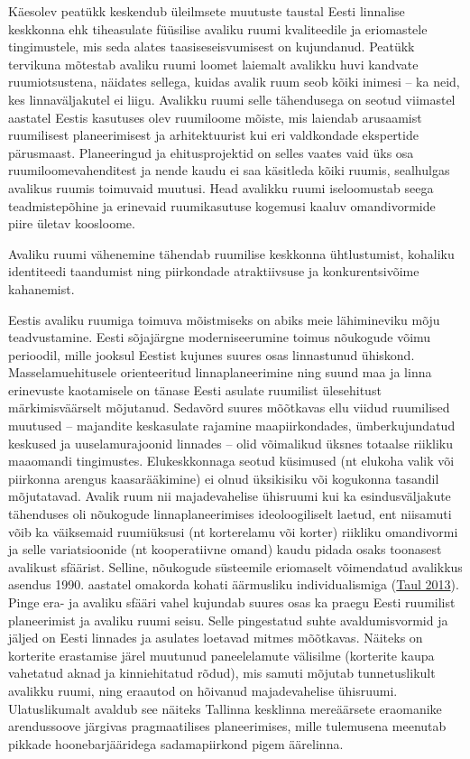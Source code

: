 \documentclass[estonian,]{article}
\begin{document}
Käesolev peatükk keskendub üleilmsete muutuste taustal Eesti linnalise keskkonna ehk tiheasulate füüsilise avaliku ruumi kvaliteedile ja eriomastele tingimustele, mis seda alates taasiseseisvumisest on kujundanud. Peatükk tervikuna mõtestab avaliku ruumi loomet laiemalt avalikku huvi kandvate ruumiotsustena, näidates sellega, kuidas avalik ruum seob kõiki inimesi -- ka neid, kes linnaväljakutel ei liigu. Avalikku ruumi selle tähendusega on seotud viimastel aastatel Eestis kasutuses olev ruumiloome mõiste, mis laiendab arusaamist ruumilisest planeerimisest ja arhitektuurist kui eri valdkondade ekspertide pärusmaast. Planeeringud ja ehitusprojektid on selles vaates vaid üks osa ruumiloomevahenditest ja nende kaudu ei saa käsitleda kõiki ruumis, sealhulgas avalikus ruumis toimuvaid muutusi. Head avalikku ruumi iseloomustab seega teadmistepõhine ja erinevaid ruumikasutuse kogemusi kaaluv omandivormide piire ületav koosloome.

\begin{blockquote-right}
Avaliku ruumi vähenemine tähendab ruumilise keskkonna ühtlustumist,
kohaliku identiteedi taandumist ning piirkondade atraktiivsuse ja
konkurentsivõime kahanemist.
\end{blockquote-right}

Eestis avaliku ruumiga toimuva mõistmiseks on abiks meie lähimineviku mõju teadvustamine. Eesti sõjajärgne moderniseerumine toimus nõukogude võimu perioodil, mille jooksul Eestist kujunes suures osas linnastunud ühiskond. Masselamuehitusele orienteeritud linnaplaneerimine ning suund maa ja linna erinevuste kaotamisele on tänase Eesti asulate ruumilist ülesehitust märkimisväärselt mõjutanud. Sedavõrd suures mõõtkavas ellu viidud ruumilised muutused -- majandite keskasulate rajamine maapiirkondades, ümberkujundatud keskused ja uuselamurajoonid linnades -- olid võimalikud üksnes totaalse riikliku maaomandi tingimustes. Elukeskkonnaga seotud küsimused (nt elukoha valik või piirkonna arengus kaasarääkimine) ei olnud üksikisiku või kogukonna tasandil mõjutatavad. Avalik ruum nii majadevahelise ühisruumi kui ka esindusväljakute tähenduses oli nõukogude linnaplaneerimises ideoloogiliselt laetud, ent niisamuti võib ka väiksemaid ruumiüksusi (nt korterelamu või korter) riikliku omandivormi ja selle variatsioonide (nt kooperatiivne omand) kaudu pidada osaks toonasest avalikust sfäärist. Selline, nõukogude süsteemile eriomaselt võimendatud avalikkus asendus 1990. aastatel omakorda kohati äärmusliku individualismiga (\protect\hyperlink{Taul2013}{Taul 2013}). Pinge era- ja avaliku sfääri vahel kujundab suures osas ka praegu Eesti ruumilist planeerimist ja avaliku ruumi seisu. Selle pingestatud suhte avaldumisvormid ja jäljed on Eesti linnades ja asulates loetavad mitmes mõõtkavas. Näiteks on korterite erastamise järel muutunud paneelelamute välisilme (korterite kaupa vahetatud aknad ja kinniehitatud rõdud), mis samuti mõjutab tunnetuslikult avalikku ruumi, ning eraautod on hõivanud majadevahelise ühisruumi. Ulatuslikumalt avaldub see näiteks Tallinna kesklinna mereäärsete eraomanike arendussoove järgivas pragmaatilises planeerimises, mille tulemusena meenutab pikkade hoonebarjääridega sadamapiirkond pigem äärelinna.
\end{document}
